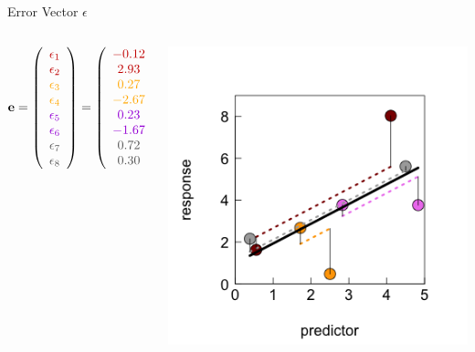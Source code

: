 \documentclass{beamer}
\begin{document}
\begin{frame}{Error Vector $\epsilon$}
    \begin{columns}
        \begin{column}{0.5\textwidth}
\[
\mathbf{e} = \left( 
\begin{array}{c} 
\color{darkred}{\epsilon_1} \\ 
\color{darkred}{\epsilon_2} \\ 
\color{orange}{\epsilon_3} \\ 
\color{orange}{\epsilon_4} \\ 
\color{violet}{\epsilon_5} \\ 
\color{violet}{\epsilon_6} \\ 
\color{darkgray}{\epsilon_7} \\ 
\color{darkgray}{\epsilon_8} 
\end{array}\right) = \left( 
\begin{array}{c} 
\color{darkred}{-0.12} \\ 
\color{darkred}{2.93} \\ 
\color{orange}{0.27} \\ 
\color{orange}{-2.67} \\ 
\color{violet}{0.23} \\ 
\color{violet}{-1.67} \\ 
\color{darkgray}{0.72} \\ 
\color{darkgray}{0.30} 
\end{array}\right)
\]
        \end{column}
        \begin{column}{0.5\textwidth}
            \includegraphics[width=\textwidth]{lectures/day_5_theory_of_mems/figures/unnamed-chunk-7-1.png}
        \end{column}
    \end{columns}
    \vspace{0.3cm}
    

\end{frame}
\end{document}

